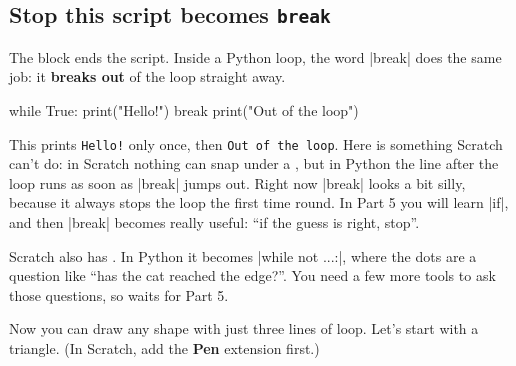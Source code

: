 \subsection*{Stop this script becomes \texttt{break}}

The  block ends the script. Inside a Python loop, the word \py|break| does the same job: it \textbf{breaks out} of the loop straight away.

\begin{tcbraster}[raster columns=2, raster equal height=rows, raster column skip=12pt, raster valign=center]
\begin{tcolorbox}[colback=white, colframe=white, boxrule=0pt, valign=center]
\begin{scratch}[scale=0.85]
\end{scratch}
\end{tcolorbox}
\begin{code}
while True:
    print("Hello!")
    break
print("Out of the loop")
\end{code}
\end{tcbraster}

This prints \texttt{Hello!} only once, then \texttt{Out of the loop}. Here is something Scratch can't do: in Scratch nothing can snap under a , but in Python the line after the loop runs as soon as \py|break| jumps out. Right now \py|break| looks a bit silly, because it always stops the loop the first time round. In Part 5 you will learn \py|if|, and then \py|break| becomes really useful: ``if the guess is right, stop''.

\begin{think}
Scratch also has . In Python it becomes \py|while not ...:|, where the dots are a question like ``has the cat reached the edge?''. You need a few more tools to ask those questions, so  waits for Part 5.
\end{think}


Now you can draw any shape with just three lines of loop. Let's start with a triangle. (In Scratch, add the \textbf{Pen} extension first.)

